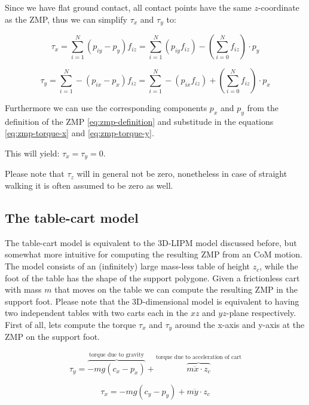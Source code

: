 \documentclass[english,ngerman]{KITreprt}
\begin{document}
Since we have flat ground contact, all contact points have the same
$z$-coordinate as the ZMP, thus we can simplify $\tau_x$ and $\tau_y$
to:

\begin{equation} \label{eq:zmp-torque-x}
\tau_x = \sum^N_{i=1} (p_{iy} - p_y) f_{iz} = \sum^N_{i=1} (p_{iy} f_{iz}) - (\sum^N_{i=0} f_{iz}) \cdot p_y
\end{equation}

\begin{equation}\label{eq:zmp-torque-y}
\tau_y = \sum^N_{i=1} - (p_{ix} - p_x) f_{iz} = \sum^N_{i=1} - (p_{ix} f_{iz}) + (\sum^N_{i=0} f_{iz}) \cdot p_x
\end{equation}

Furthermore we can use the corresponding components $p_x$ and $p_y$ from
the definition of the ZMP \ref{eq:zmp-definition} and substitude in the
equations \ref{eq:zmp-torque-x} and \ref{eq:zmp-torque-y}.

This will yield: $\tau_x = \tau_y = 0$.

Please note that $\tau_z$ will in general not be zero, nonetheless in
case of straight walking it is often assumed to be zero as well.

\subsection{The table-cart model}\label{section:table-cart}

The table-cart model is equivalent to the 3D-LIPM model discussed
before, but somewhat more intuitive for computing the resulting ZMP from
an CoM motion. The model consists of an (infinitely) large mass-less
table of height $z_c$, while the foot of the table has the shape of the
support polygone. Given a frictionless cart with mass $m$ that moves on
the table we can compute the resulting ZMP in the support foot. Please
note that the 3D-dimensional model is equivalent to having two
independent tables with two carts each in the $xz$ and $yz$-plane
respectively. First of all, lets compute the torque $\tau_x$ and
$\tau_y$ around the x-axis and y-axis at the ZMP on the support foot.

\begin{equation}
\tau_y = \overbrace{-m g (c_x - p_x)}^{\text{torque due to gravity}} + \overbrace{m \ddot{x} \cdot z_c}^{\text{torque due to acceleration of cart}}
\end{equation}

\begin{equation}
\tau_x = -m g (c_y - p_y) + m \ddot{y} \cdot z_c
\end{equation}
\end{document}
